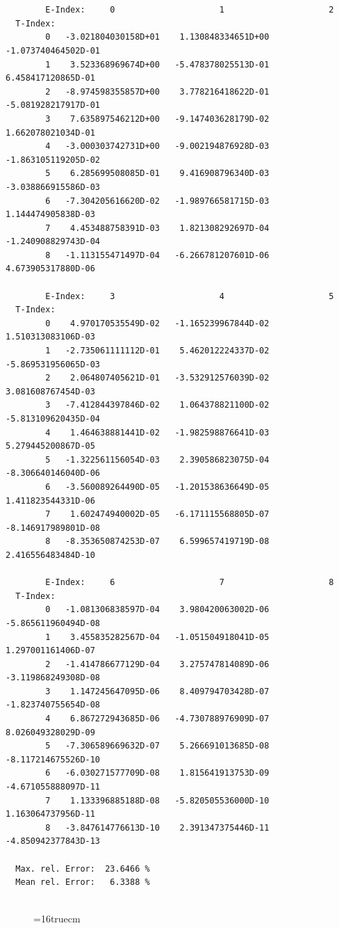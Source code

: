 \documentclass[12pt,dvips]{article}
\begin{document}
\begin{small}\begin{verbatim}


        E-Index:     0                     1                     2
  T-Index:
        0   -3.021804030158D+01    1.130848334651D+00   -1.073740464502D-01
        1    3.523368969674D+00   -5.478378025513D-01    6.458417120865D-01
        2   -8.974598355857D+00    3.778216418622D-01   -5.081928217917D-01
        3    7.635897546212D+00   -9.147403628179D-02    1.662078021034D-01
        4   -3.000303742731D+00   -9.002194876928D-03   -1.863105119205D-02
        5    6.285699508085D-01    9.416908796340D-03   -3.038866915586D-03
        6   -7.304205616620D-02   -1.989766581715D-03    1.144474905838D-03
        7    4.453488758391D-03    1.821308292697D-04   -1.240908829743D-04
        8   -1.113155471497D-04   -6.266781207601D-06    4.673905317880D-06

        E-Index:     3                     4                     5
  T-Index:
        0    4.970170535549D-02   -1.165239967844D-02    1.510313083106D-03
        1   -2.735061111112D-01    5.462012224337D-02   -5.869531956065D-03
        2    2.064807405621D-01   -3.532912576039D-02    3.081608767454D-03
        3   -7.412844397846D-02    1.064378821100D-02   -5.813109620435D-04
        4    1.464638881441D-02   -1.982598876641D-03    5.279445200867D-05
        5   -1.322561156054D-03    2.390586823075D-04   -8.306640146040D-06
        6   -3.560089264490D-05   -1.201538636649D-05    1.411823544331D-06
        7    1.602474940002D-05   -6.171115568805D-07   -8.146917989801D-08
        8   -8.353650874253D-07    6.599657419719D-08    2.416556483484D-10

        E-Index:     6                     7                     8
  T-Index:
        0   -1.081306838597D-04    3.980420063002D-06   -5.865611960494D-08
        1    3.455835282567D-04   -1.051504918041D-05    1.297001161406D-07
        2   -1.414786677129D-04    3.275747814089D-06   -3.119868249308D-08
        3    1.147245647095D-06    8.409794703428D-07   -1.823740755654D-08
        4    6.867272943685D-06   -4.730788976909D-07    8.026049328029D-09
        5   -7.306589669632D-07    5.266691013685D-08   -8.117214675526D-10
        6   -6.030271577709D-08    1.815641913753D-09   -4.671055888097D-11
        7    1.133396885188D-08   -5.820505536000D-10    1.163064737956D-11
        8   -3.847614776613D-10    2.391347375446D-11   -4.850942377843D-13

  Max. rel. Error:  23.6466 %
  Mean rel. Error:   6.3388 %


\end{verbatim}\end{small}
\begin{figure} \label{2.3.2b}
\epsfxsize=16truecm
\end{figure}
\newpage
\end{document}
